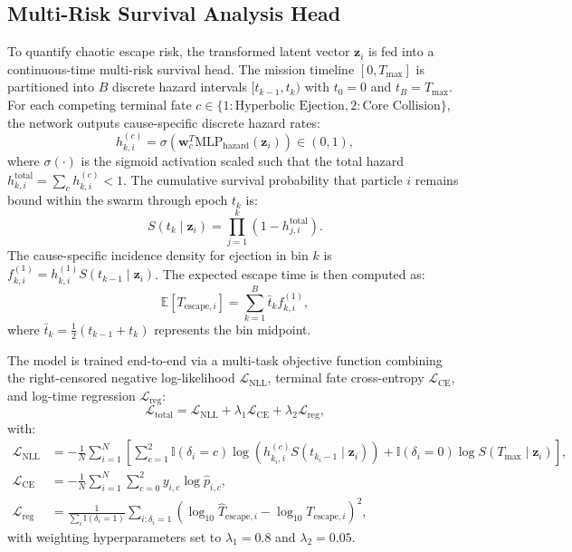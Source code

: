 \documentclass[preprint,12pt,3p]{elsarticle}
\begin{document}
\subsection{Multi-Risk Survival Analysis Head}
To quantify chaotic escape risk, the transformed latent vector $\bm{z}_i$ is fed into a continuous-time multi-risk survival head. The mission timeline $[0, T_{\max}]$ is partitioned into $B$ discrete hazard intervals $[t_{k-1}, t_k)$ with $t_0 = 0$ and $t_B = T_{\max}$. For each competing terminal fate $c \in \{1: \text{Hyperbolic Ejection}, 2: \text{Core Collision}\}$, the network outputs cause-specific discrete hazard rates:
\begin{equation}
h_{k, i}^{(c)} = \sigma\left( \bm{w}_c^T \mathrm{MLP}_{\mathrm{hazard}}(\bm{z}_i) \right) \in (0, 1),
\label{eq:hazard_rate}
\end{equation}
where $\sigma(\cdot)$ is the sigmoid activation scaled such that the total hazard $h_{k, i}^{\mathrm{total}} = \sum_{c} h_{k, i}^{(c)} < 1$. The cumulative survival probability that particle $i$ remains bound within the swarm through epoch $t_k$ is:
\begin{equation}
S(t_k \mid \bm{z}_i) = \prod_{j=1}^{k} \left( 1 - h_{j, i}^{\mathrm{total}} \right).
\label{eq:survival_function}
\end{equation}
The cause-specific incidence density for ejection in bin $k$ is $f_{k, i}^{(1)} = h_{k, i}^{(1)} S(t_{k-1} \mid \bm{z}_i)$. The expected escape time is then computed as:
\begin{equation}
\mathbb{E}[T_{\mathrm{escape}, i}] = \sum_{k=1}^{B} \bar{t}_k f_{k, i}^{(1)},
\label{eq:expected_escape_time}
\end{equation}
where $\bar{t}_k = \frac{1}{2}(t_{k-1} + t_k)$ represents the bin midpoint.

The model is trained end-to-end via a multi-task objective function combining the right-censored negative log-likelihood $\mathcal{L}_{\mathrm{NLL}}$, terminal fate cross-entropy $\mathcal{L}_{\mathrm{CE}}$, and log-time regression $\mathcal{L}_{\mathrm{reg}}$:
\begin{equation}
\mathcal{L}_{\mathrm{total}} = \mathcal{L}_{\mathrm{NLL}} + \lambda_1 \mathcal{L}_{\mathrm{CE}} + \lambda_2 \mathcal{L}_{\mathrm{reg}},
\label{eq:loss_total}
\end{equation}
with:
\begin{align}
\mathcal{L}_{\mathrm{NLL}} &= -\frac{1}{N} \sum_{i=1}^{N} \left[ \sum_{c=1}^{2} \mathbb{I}(\delta_i = c) \log\left( h_{k_i, i}^{(c)} S(t_{k_i-1} \mid \bm{z}_i) \right) + \mathbb{I}(\delta_i = 0) \log S(T_{\max} \mid \bm{z}_i) \right], \label{eq:loss_nll} \\
\mathcal{L}_{\mathrm{CE}} &= -\frac{1}{N} \sum_{i=1}^{N} \sum_{c=0}^{2} y_{i, c} \log \hat{p}_{i, c}, \label{eq:loss_ce} \\
\mathcal{L}_{\mathrm{reg}} &= \frac{1}{\sum_i \mathbb{I}(\delta_i = 1)} \sum_{i: \delta_i = 1} \left( \log_{10} \hat{T}_{\mathrm{escape}, i} - \log_{10} T_{\mathrm{escape}, i} \right)^2, \label{eq:loss_reg}
\end{align}
with weighting hyperparameters set to $\lambda_1 = 0.8$ and $\lambda_2 = 0.05$.
\end{document}
